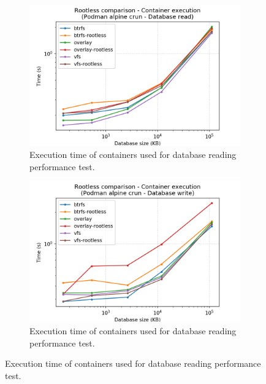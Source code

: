 \begin{figure}[h!]
    \begin{subfigure}{.5\textwidth}
      \centering
      \includegraphics[width=\linewidth]{images/rootless/rootless-execution-Podman-alpine-crun---Database-read.png}
      \caption{Execution time of containers used for database reading performance test.}
      \label{fig:rootless:db-read-exec}
    \end{subfigure}
    \begin{subfigure}{.5\textwidth}
      \centering
      \includegraphics[width=\linewidth]{images/rootless/rootless-execution-Podman-alpine-crun---Database-write.png}
      \caption{Execution time of containers used for database reading performance test.}
      \label{fig:rootless:db-write-exec}
    \end{subfigure}
    

\end{figure}
